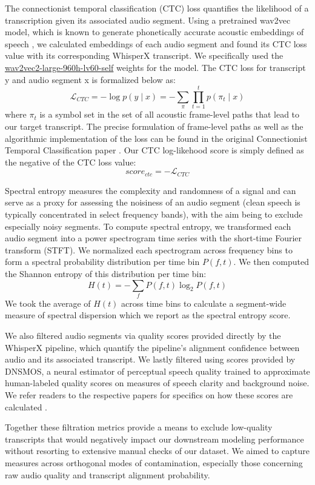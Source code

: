 \documentclass[pdflatex,sn-basic]{sn-jnl}%
\theoremstyle{thmstyleone}%
\theoremstyle{thmstyletwo}%
\theoremstyle{thmstylethree}%
\begin{document}
The connectionist temporal classification (CTC) loss quantifies the likelihood of a transcription given its associated audio segment. Using a pretrained wav2vec model, which is known to generate phonetically accurate acoustic embeddings of speech \citep{bib83}, we calculated embeddings of each audio segment and found its CTC loss value with its corresponding WhisperX transcript. We specifically used the \href{https://huggingface.co/facebook/wav2vec2-large-960h-lv60-self}{wav2vec2-large-960h-lv60-self} weights for the model. The CTC loss for transcript y and audio segment x is formalized below as:
\[
\mathcal{L}_{CTC}=-\log{p(y \mid x)}=-\sum_{\pi}\prod_{t=1}^{t}p(\pi_{t}\mid x)
\]
where $\pi_{t}$ is a symbol set in the set of all acoustic frame-level paths that lead to our target transcript. The precise formulation of frame-level paths as well as the algorithmic implementation of the loss can be found in the original Connectionist Temporal Classification paper \citep{bib84}. Our CTC log-likehood score is simply defined as the negative of the CTC loss value:
\[
score_\mathit{ctc}=-\mathcal{L}_\mathit{CTC}
\]

Spectral entropy measures the complexity and randomness of a signal and can serve as a proxy for assessing the noisiness of an audio segment (clean speech is typically concentrated in select frequency bands), with the aim being to exclude especially noisy segments. To compute spectral entropy, we transformed each audio segment into a power spectrogram time series with the short-time Fourier transform (STFT). We normalized each spectrogram across frequency bins to form a spectral probability distribution per time bin $P(f, t)$. We then computed the Shannon entropy of this distribution per time bin:
\[
H(t)=-\sum_{f}P(f,t)\log_{2}P(f,t)
\]
We took the average of $H(t)$ across time bins to calculate a segment-wide measure of spectral dispersion which we report as the spectral entropy score.

We also filtered audio segments via quality scores provided directly by the WhisperX pipeline, which quantify the pipeline’s alignment confidence between audio and its associated transcript. We lastly filtered using scores provided by DNSMOS, a neural estimator of perceptual speech quality trained to approximate human-labeled quality scores on measures of speech clarity and background noise. We refer readers to the respective papers for specifics on how these scores are calculated \citep{bib39,bib85}.

Together these filtration metrics provide a means to exclude low-quality transcripts that would negatively impact our downstream modeling performance without resorting to extensive manual checks of our dataset. We aimed to capture measures across orthogonal modes of contamination, especially those concerning raw audio quality and transcript alignment probability.  
\end{document}
